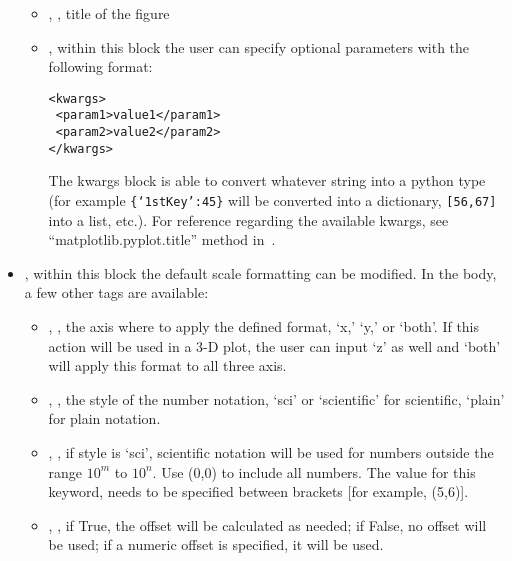 \begin{itemize}
  \begin{itemize}
    \item {}, , title of the figure
    \item {}, within this block the user can specify optional parameters
    with the following format:

\begin{lstlisting}[style=XML]
<kwargs>
 <param1>value1</param1>
 <param2>value2</param2>
</kwargs>
\end{lstlisting}

  The kwargs block is able to convert whatever string into a python type (for
  example \texttt{\{`1stKey':45\}} will
  be converted into a dictionary, 
  \texttt{[56,67]} into a list, etc.).
    For reference regarding the available kwargs, see
    ``matplotlib.pyplot.title'' method in~\cite{MatPlotLib}.
  \end{itemize}
  \item {}, within this block the default scale formatting
  can be modified.
  In the body, a few other tags are available:
 \begin{itemize}
    \item {}, , the axis where to apply the defined
    format, `x,' `y,' or `both'.
    \nb If this action will be used in a 3-D plot, the user can input `z' as
    well and `both' will apply this format to all three axis.
    \item {}, , the style of the number notation,
    `sci' or `scientific' for scientific, `plain' for plain notation.
    \item {}, , if
    style is `sci', scientific notation will be used for numbers outside the
    range $10^m$ to $10^n$.
    Use (0,0) to include all numbers.
    \nb The value for this keyword, needs to be specified between brackets [for
    example, (5,6)].
    \item {}, , if True, the offset
    will be calculated as needed; if False, no offset will be used; if a numeric
    offset is specified, it will be used.
  \end{itemize}

\end{itemize}
